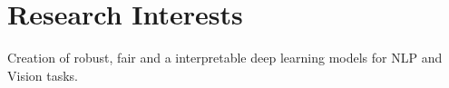 \section{Research Interests}
\quad Creation of robust, fair and a interpretable deep learning models for NLP and Vision tasks.

